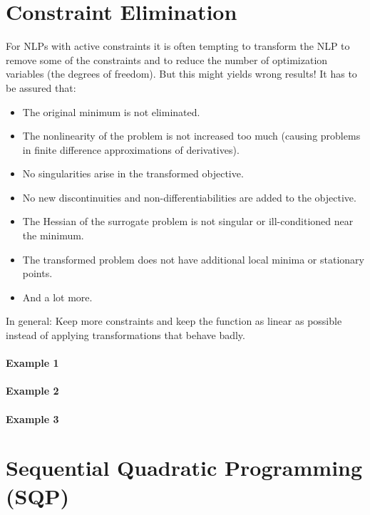 	\section{Constraint Elimination}
		For NLPs with active constraints it is often tempting to transform the NLP to remove some of the constraints and to reduce the number of optimization variables (the degrees of freedom). But this might yields wrong results! It has to be assured that:
		\begin{itemize}
			\item The original minimum is not eliminated.
			\item The nonlinearity of the problem is not increased too much (causing problems in finite difference approximations of derivatives).
			\item No singularities arise in the transformed objective.
			\item No new discontinuities and non-differentiabilities are added to the objective.
			\item The Hessian of the surrogate problem is not singular or ill-conditioned near the minimum.
			\item The transformed problem does not have additional local minima or stationary points.
			\item And a lot more.
		\end{itemize}
		In general: Keep more constraints and keep the function as linear as possible instead of applying transformations that behave badly.

		\paragraph{Example 1} %

		\paragraph{Example 2} %

		\paragraph{Example 3} %

	\section{Sequential Quadratic Programming (SQP)}
		\label{sec:sqp}
	
